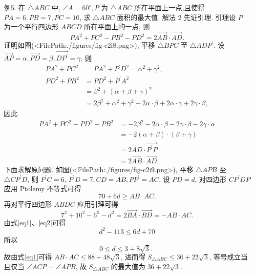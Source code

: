例5. 在 $\triangle A B C$ 中, $\angle A=60^{\circ}, P$ 为 $\triangle A B C$ 所在平面上一点,且使得 $P A=6, P B=7, P C=10$, 求 $\triangle A B C$ 面积的最大值.
解法 2 先证引理.
引理设 $P$ 为一个平行四边形 $A B C D$ 所在平面上的一点, 则
$$
P A^2+P C^2-P B^2-P D^2=2 \overrightarrow{A B} \cdot \overrightarrow{A D} .
$$
证明如图(<FilePath:./figures/fig-c2i8.png>), 平移 $\triangle B P C$ 至 $\triangle A D P^{\prime}$. 设 $\overrightarrow{A P}=\alpha, \overrightarrow{P D}=\beta, \overrightarrow{D P^{\prime}}=\gamma$, 则
$$
\begin{aligned}
P A^2+P C^2 & =P A^2+P^{\prime} D^2=\alpha^2+\gamma^2, \\
P D^2+P B^2 & =P D^2+P^{\prime} A^2 \\
& =\beta^2+(\alpha+\beta+\gamma)^2 \\
& =2 \beta^2+\alpha^2+\gamma^2+2 \alpha \cdot \beta+2 \alpha \cdot \gamma+2 \gamma \cdot \beta,
\end{aligned}
$$
因此
$$
\begin{aligned}
P A^2+P C^2-P D^2-P B^2 & =-2 \beta^2-2 \alpha \cdot \beta-2 \gamma \cdot \beta-2 \gamma \cdot \alpha \\
& =-2(\alpha+\beta) \cdot(\beta+\gamma) \\
& =2 \overrightarrow{A D} \cdot \overrightarrow{P^{\prime} P} \\
& =2 \overrightarrow{A B} \cdot \overrightarrow{A D} .
\end{aligned}
$$
下面求解原问题.
如图(<FilePath:./figures/fig-c2i9.png>), 平移 $\triangle A P B$ 至 $\triangle C P^{\prime} D$, 则 $P^{\prime} C=6$, $P^{\prime} D=7, C D=A B, P P^{\prime}=A C$.
设 $P D=d$, 对四边形 $C P^{\prime} D P$ 应用 Ptolemy 不等式可得
$$
70+6 d \geqslant A B \cdot A C . \label{eq1}
$$
再对平行四边形 $A B D C$ 应用引理可得
$$
7^2+10^2-6^2-d^2=2 \overrightarrow{B A} \cdot \overrightarrow{B D}=-A B \cdot A C . \label{eq2}
$$
由式\ref{eq1}、\ref{eq2}可得
$$
d^2-113 \leqslant 6 d+70
$$
所以
$$
0 \leqslant d \leqslant 3+8 \sqrt{3} \text {. }
$$
故由式\ref{eq1}可得 $A B \cdot A C \leqslant 88+48 \sqrt{3}$, 进而得 $S_{\triangle A B C} \leqslant 36+22 \sqrt{3}$, 等号成立当且仅当 $\angle A C P=\angle A P B$, 故 $S_{\triangle A B C}$ 的最大值为 $36+22 \sqrt{3}$.



